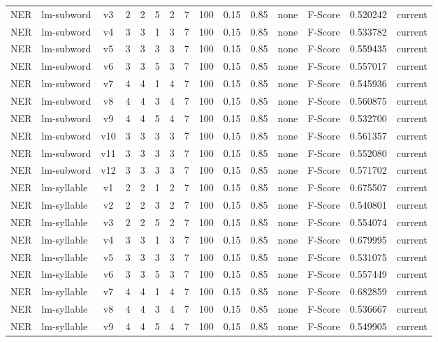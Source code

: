 \documentclass{article}
\begin{document}
\begin{xltabular}{\linewidth}{@{}lYcrrrrrrrrYlrl@{}}
NER & lm-subword & v3 & 2 & 2 & 5 & 2 & 7 & 100 & 0.15 & 0.85 & none & F-Score & 0.520242 & current \\
NER & lm-subword & v4 & 3 & 3 & 1 & 3 & 7 & 100 & 0.15 & 0.85 & none & F-Score & 0.533782 & current \\
NER & lm-subword & v5 & 3 & 3 & 3 & 3 & 7 & 100 & 0.15 & 0.85 & none & F-Score & 0.559435 & current \\
NER & lm-subword & v6 & 3 & 3 & 5 & 3 & 7 & 100 & 0.15 & 0.85 & none & F-Score & 0.557017 & current \\
NER & lm-subword & v7 & 4 & 4 & 1 & 4 & 7 & 100 & 0.15 & 0.85 & none & F-Score & 0.545936 & current \\
NER & lm-subword & v8 & 4 & 4 & 3 & 4 & 7 & 100 & 0.15 & 0.85 & none & F-Score & 0.560875 & current \\
NER & lm-subword & v9 & 4 & 4 & 5 & 4 & 7 & 100 & 0.15 & 0.85 & none & F-Score & 0.532700 & current \\
NER & lm-subword & v10 & 3 & 3 & 3 & 3 & 7 & 100 & 0.15 & 0.85 & none & F-Score & 0.561357 & current \\
NER & lm-subword & v11 & 3 & 3 & 3 & 3 & 7 & 100 & 0.15 & 0.85 & none & F-Score & 0.552080 & current \\
NER & lm-subword & v12 & 3 & 3 & 3 & 3 & 7 & 100 & 0.15 & 0.85 & none & F-Score & 0.571702 & current \\
NER & lm-syllable & v1 & 2 & 2 & 1 & 2 & 7 & 100 & 0.15 & 0.85 & none & F-Score & 0.675507 & current \\
NER & lm-syllable & v2 & 2 & 2 & 3 & 2 & 7 & 100 & 0.15 & 0.85 & none & F-Score & 0.540801 & current \\
NER & lm-syllable & v3 & 2 & 2 & 5 & 2 & 7 & 100 & 0.15 & 0.85 & none & F-Score & 0.554074 & current \\
NER & lm-syllable & v4 & 3 & 3 & 1 & 3 & 7 & 100 & 0.15 & 0.85 & none & F-Score & 0.679995 & current \\
NER & lm-syllable & v5 & 3 & 3 & 3 & 3 & 7 & 100 & 0.15 & 0.85 & none & F-Score & 0.531075 & current \\
NER & lm-syllable & v6 & 3 & 3 & 5 & 3 & 7 & 100 & 0.15 & 0.85 & none & F-Score & 0.557449 & current \\
NER & lm-syllable & v7 & 4 & 4 & 1 & 4 & 7 & 100 & 0.15 & 0.85 & none & F-Score & 0.682859 & current \\
NER & lm-syllable & v8 & 4 & 4 & 3 & 4 & 7 & 100 & 0.15 & 0.85 & none & F-Score & 0.536667 & current \\
NER & lm-syllable & v9 & 4 & 4 & 5 & 4 & 7 & 100 & 0.15 & 0.85 & none & F-Score & 0.549905 & current \\

\end{xltabular}
\end{document}
